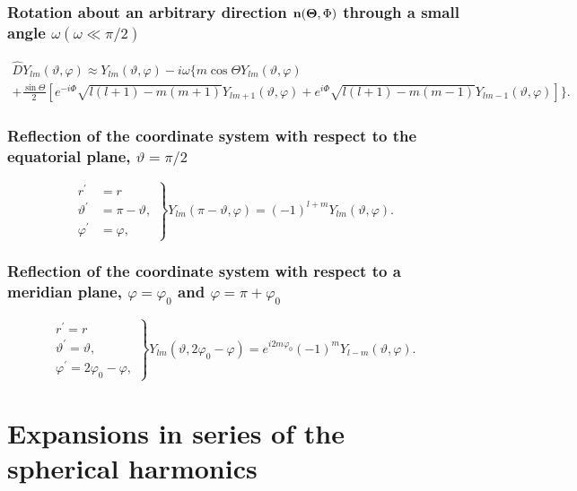 \subsubsection{Rotation about an arbitrary direction $\mathbf{n}(\boldsymbol{\Theta}, \Phi)$ through a small angle $\omega(\omega \ll \pi / 2)$}
\begin{multline}
\hat{D} Y_{l m}(\vartheta, \varphi) \approx Y_{l m}(\vartheta, \varphi)-i \omega\biggl\{m \cos \Theta Y_{l m}(\vartheta, \varphi) \\
+\frac{\sin \Theta}{2}\left[e^{-i \Phi} \sqrt{l(l+1)-m(m+1)} Y_{l m+1}(\vartheta, \varphi)+e^{i \Phi} \sqrt{l(l+1)-m(m-1)} Y_{l m-1}(\vartheta, \varphi)\right]\biggr\} . \label{eq:5:5:10}
\end{multline}
\subsubsection{Reflection of the coordinate system with respect to the equatorial plane, $\vartheta=\pi / 2$}
\begin{equation}
\left.\begin{array}{rl}
r^{\prime} & =r  \label{eq:5:5:11}\\
\vartheta^{\prime} & =\pi-\vartheta, \\
\varphi^{\prime} & =\varphi,
\end{array}\right\} Y_{l m}(\pi-\vartheta, \varphi)=(-1)^{l+m} Y_{l m}(\vartheta, \varphi).
\end{equation}
\subsubsection{Reflection of the coordinate system with respect to a meridian plane, $\varphi=\varphi_{0}$ and $\varphi=\pi+\varphi_{0}$}
\begin{equation}
\left.\begin{array}{l}
r^{\prime}=r  \label{eq:5:5:12}\\
\vartheta^{\prime}=\vartheta, \\
\varphi^{\prime}=2 \varphi_{0}-\varphi,
\end{array}\right\} Y_{l m}\left(\vartheta, 2 \varphi_{0}-\varphi\right)=e^{i 2 m \varphi_{0}}(-1)^{m} Y_{l-m}(\vartheta, \varphi).
\end{equation}
\section{Expansions in series of the spherical harmonics}\label{sec:5.6}
